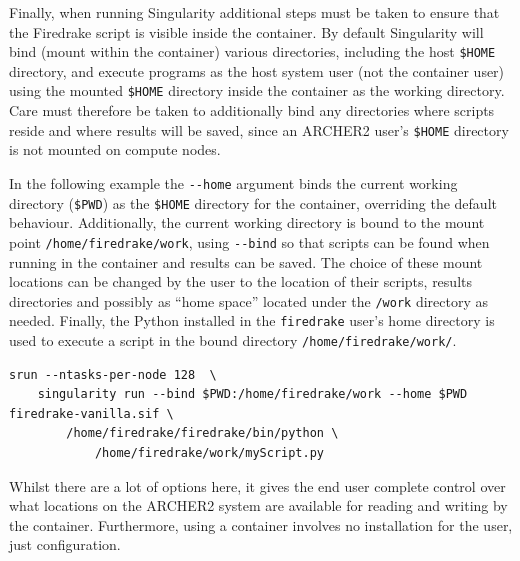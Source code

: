 \documentclass[a4paper,11pt]{article}
\begin{document}
Finally, when running Singularity additional steps must be taken to ensure that the Firedrake script is visible inside the container.
By default Singularity will bind (mount within the container) various directories, including the host \verb`$HOME` directory, and execute programs as the host system user (not the container user) using the mounted \verb`$HOME` directory inside the container as the working  directory.
Care must therefore be taken to additionally bind any directories where scripts reside and where results will be saved, since an ARCHER2 user's \verb`$HOME` directory is not mounted on compute nodes.

In the following example the \verb`--home` argument binds the current working directory (\verb`$PWD`) as the \verb`$HOME` directory for the container, overriding the default behaviour.
Additionally, the current working directory is bound to the mount point \verb`/home/firedrake/work`, using \verb`--bind` so that scripts can be found when running in the container and results can be saved.
The choice of these mount locations can be changed by the user to the location of their scripts, results directories and possibly as ``home space'' located under the \verb`/work` directory as needed.
Finally, the Python installed in the \verb`firedrake` user's home directory is used to execute a script in the bound directory \verb`/home/firedrake/work/`.

\begin{lstlisting}
srun --ntasks-per-node 128  \
    singularity run --bind $PWD:/home/firedrake/work --home $PWD firedrake-vanilla.sif \
        /home/firedrake/firedrake/bin/python \
            /home/firedrake/work/myScript.py
\end{lstlisting}
Whilst there are a lot of options here, it gives the end user complete control over what locations on the ARCHER2 system are available for reading and writing by the container.
Furthermore, using a container involves no installation for the user, just configuration.
\end{document}
